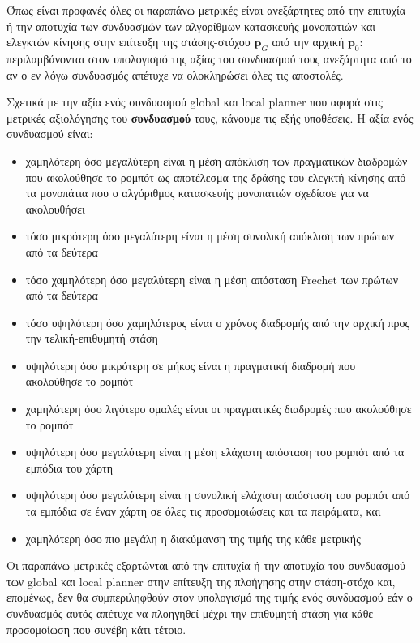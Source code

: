 Όπως είναι προφανές όλες οι παραπάνω μετρικές είναι ανεξάρτητες από την
επιτυχία ή την αποτυχία των συνδυασμών των αλγορίθμων κατασκευής μονοπατιών και
ελεγκτών κίνησης στην επίτευξη της στάσης-στόχου $\bm{p}_G$ από την αρχική
$\bm{p}_0$: περιλαμβάνονται στον υπολογισμό της αξίας του συνδυασμού τους
ανεξάρτητα από το αν ο εν λόγω συνδυασμός απέτυχε να ολοκληρώσει όλες τις
αποστολές.


Σχετικά με την αξία ενός συνδυασμού global και local planner που αφορά στις
μετρικές αξιολόγησης του \textbf{συνδυασμού} τους, κάνουμε τις εξής
υποθέσεις. Η αξία ενός συνδυασμού είναι:

\begin{itemize}
  \item χαμηλότερη όσο μεγαλύτερη είναι η μέση απόκλιση των πραγματικών
        διαδρομών που ακολούθησε το ρομπότ ως αποτέλεσμα της δράσης του ελεγκτή
        κίνησης από τα μονοπάτια που ο αλγόριθμος κατασκευής μονοπατιών σχεδίασε
        για να ακολουθήσει
  \item τόσο μικρότερη όσο μεγαλύτερη είναι η μέση συνολική απόκλιση των πρώτων
        από τα δεύτερα
  \item τόσο χαμηλότερη όσο μεγαλύτερη είναι η μέση απόσταση Frechet των πρώτων
        από τα δεύτερα
  \item τόσο υψηλότερη όσο χαμηλότερος είναι ο χρόνος διαδρομής από την αρχική
        προς την τελική-επιθυμητή στάση
  \item υψηλότερη όσο μικρότερη σε μήκος είναι η πραγματική διαδρομή που
        ακολούθησε το ρομπότ
  \item χαμηλότερη όσο λιγότερο ομαλές είναι οι πραγματικές διαδρομές που
        ακολούθησε το ρομπότ
  \item υψηλότερη όσο μεγαλύτερη είναι η μέση ελάχιστη απόσταση του ρομπότ από
        τα εμπόδια του χάρτη
  \item υψηλότερη όσο μεγαλύτερη είναι η συνολική ελάχιστη απόσταση του ρομπότ
        από τα εμπόδια σε έναν χάρτη σε όλες τις προσομοιώσεις και τα πειράματα,
        και
  \item χαμηλότερη όσο πιο μεγάλη η διακύμανση της τιμής της κάθε μετρικής
\end{itemize}

Οι παραπάνω μετρικές εξαρτώνται από την επιτυχία ή την αποτυχία του συνδυασμού
των global και local planner στην επίτευξη της πλοήγησης στην στάση-στόχο και,
επομένως, δεν θα συμπεριληφθούν στον υπολογισμό της τιμής ενός συνδυασμού εάν ο
συνδυασμός αυτός απέτυχε να πλοηγηθεί μέχρι την επιθυμητή στάση για κάθε
προσομοίωση που συνέβη κάτι τέτοιο.
